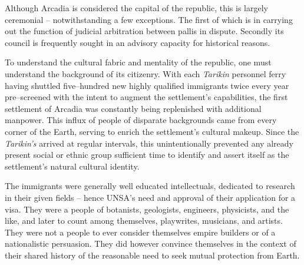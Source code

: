 Although Arcadia is considered the capital of the republic, this is largely ceremonial -- notwithstanding a few exceptions. The first of which is in carrying out the function of judicial arbitration between pallis in dispute. Secondly its council is frequently sought in an advisory capacity for historical reasons.

To understand the cultural fabric and mentality of the republic, one must understand the background of its citizenry. With each {\it Tarikin} personnel ferry having shuttled five--hundred new highly qualified immigrants twice every year pre--screened with the intent to augment the settlement's capabilities, the first settlement of Arcadia was constantly being replenished with additional manpower. This influx of people of disparate backgrounds came from every corner of the Earth, serving to enrich the settlement's cultural makeup. Since the {\it Tarikin's} arrived at regular intervals, this unintentionally prevented any already present social or ethnic group sufficient time to identify and assert itself as the settlement's natural cultural identity.

The immigrants were generally well educated intellectuals, dedicated to research in their given fields -- hence UNSA's need and approval of their application for a visa. They were a people of botanists, geologists, engineers, physicists, and the like, and later to count among themselves, playwrites, musicians, and artists. They were not a people to ever consider themselves empire builders or of a nationalistic persuasion. They did however convince themselves in the context of their shared history of the reasonable need to seek mutual protection from Earth.

